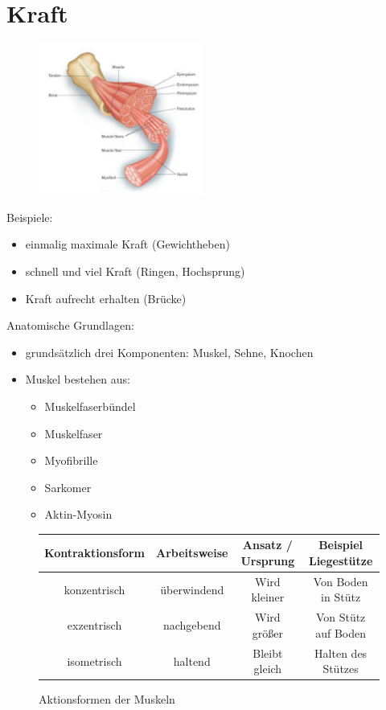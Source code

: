 
\section{Kraft}

\begin{figure}
    \begin{center}
        \includegraphics[width=0.48\textwidth]{pictures/muskeln}
    \end{center}
\end{figure}

Beispiele:
\begin{itemize}
    \item einmalig maximale Kraft (Gewichtheben)
    \item schnell und viel Kraft (Ringen, Hochsprung)
    \item Kraft aufrecht erhalten (Brücke)
\end{itemize}

Anatomische Grundlagen:
\begin{itemize}
    \item grundsätzlich drei Komponenten: Muskel, Sehne, Knochen
    \item Muskel bestehen aus:
    \begin{itemize}
        \item Muskelfaserbündel
        \item Muskelfaser
        \item Myofibrille
        \item Sarkomer
        \item Aktin-Myosin
    \end{itemize}
\end{itemize}

\begin{figure}[h]
\begin{tabular}{|c|c|c|c|}
 \hline
Kontraktionsform & Arbeitsweise & Ansatz / Ursprung & Beispiel Liegestütze \\ \hline \hline
konzentrisch & überwindend & Wird kleiner & Von Boden in Stütz \\ \hline
exzentrisch & nachgebend & Wird größer & Von Stütz auf Boden \\ \hline
isometrisch & haltend & Bleibt gleich & Halten des Stützes \\ \hline
\end{tabular}
\caption{Aktionsformen der Muskeln}
\end{figure}

